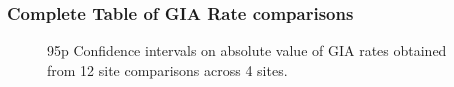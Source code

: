 \subsubsection{Complete Table of GIA Rate comparisons}

\begin{figure}[H]
	\caption{95p Confidence intervals on absolute value of GIA rates obtained from 12 site comparisons across 4 sites.}
	\label{fig:intervalsGIA}
\end{figure}


\newpage

